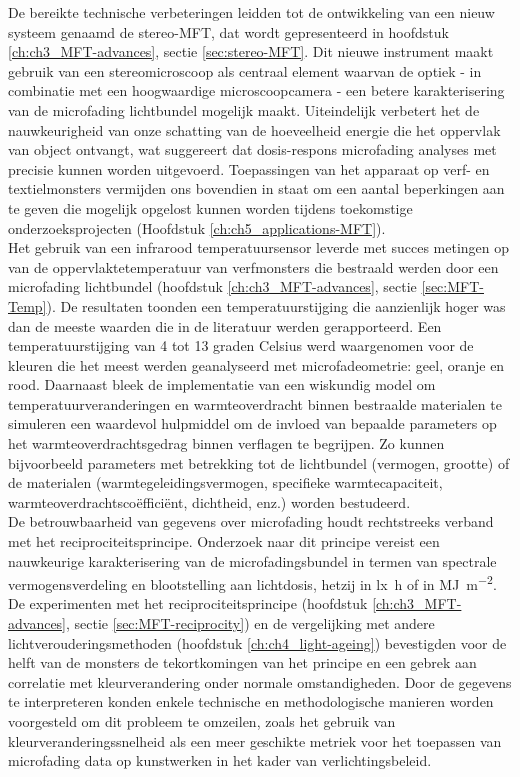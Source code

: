De bereikte technische verbeteringen leidden tot de ontwikkeling van een nieuw systeem genaamd de stereo-MFT, dat wordt gepresenteerd in hoofdstuk \ref{ch:ch3_MFT-advances}, sectie \ref{sec:stereo-MFT}. Dit nieuwe instrument maakt gebruik van een stereomicroscoop als centraal element waarvan de optiek - in combinatie met een hoogwaardige microscoopcamera - een betere karakterisering van de microfading lichtbundel mogelijk maakt. Uiteindelijk verbetert het de nauwkeurigheid van onze schatting van de hoeveelheid energie die het oppervlak van object ontvangt, wat suggereert dat dosis-respons microfading analyses met precisie kunnen worden uitgevoerd. Toepassingen van het apparaat op verf- en textielmonsters vermijden ons bovendien in staat om een aantal beperkingen aan te geven die mogelijk opgelost kunnen worden tijdens toekomstige onderzoeksprojecten (Hoofdstuk \ref{ch:ch5_applications-MFT}).\\

Het gebruik van een infrarood temperatuursensor leverde met succes metingen op van de oppervlaktetemperatuur van verfmonsters die bestraald werden door een microfading lichtbundel (hoofdstuk \ref{ch:ch3_MFT-advances}, sectie \ref{sec:MFT-Temp}). De resultaten toonden een temperatuurstijging die aanzienlijk hoger was dan de meeste waarden die in de literatuur werden gerapporteerd. Een temperatuurstijging van 4 tot 13 graden Celsius werd waargenomen voor de kleuren die het meest werden geanalyseerd met microfadeometrie: geel, oranje en rood. Daarnaast bleek de implementatie van een wiskundig model om temperatuurveranderingen en warmteoverdracht binnen bestraalde materialen te simuleren een waardevol hulpmiddel om de invloed van bepaalde parameters op het warmteoverdrachtsgedrag binnen verflagen te begrijpen. Zo kunnen bijvoorbeeld parameters met betrekking tot de lichtbundel (vermogen, grootte) of de materialen (warmtegeleidingsvermogen, specifieke warmtecapaciteit, warmteoverdrachtscoëfficiënt, dichtheid, enz.) worden bestudeerd. \\

De betrouwbaarheid van gegevens over microfading houdt rechtstreeks verband met het reciprociteitsprincipe. Onderzoek naar dit principe vereist een nauwkeurige karakterisering van de microfadingsbundel in termen van spectrale vermogensverdeling en blootstelling aan lichtdosis, hetzij in \unit{\lux\hour} of in \unit{\mega\joule\per\square\metre}. De experimenten met het reciprociteitsprincipe (hoofdstuk \ref{ch:ch3_MFT-advances}, sectie \ref{sec:MFT-reciprocity}) en de vergelijking met andere lichtverouderingsmethoden (hoofdstuk \ref{ch:ch4_light-ageing}) bevestigden voor de helft van de monsters de tekortkomingen van het principe en een gebrek aan correlatie met kleurverandering onder normale omstandigheden. Door de gegevens te interpreteren konden enkele technische en methodologische manieren worden voorgesteld om dit probleem te omzeilen, zoals het gebruik van kleurveranderingssnelheid als een meer geschikte metriek voor het toepassen van microfading data op kunstwerken in het kader van verlichtingsbeleid.\\

